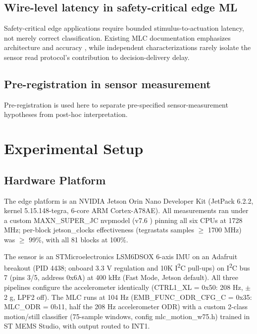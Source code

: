 \subsection{Wire-level latency in safety-critical edge ML}

Safety-critical edge applications require bounded stimulus-to-actuation latency, not merely correct classification. Existing MLC documentation emphasizes architecture and accuracy \cite{ref2}, while independent characterizations rarely isolate the sensor read protocol's contribution to decision-delivery delay.

\subsection{Pre-registration in sensor measurement}

Pre-registration is used here to separate pre-specified sensor-measurement hypotheses from post-hoc interpretation.


\section{Experimental Setup}

\subsection{Hardware Platform}

The edge platform is an NVIDIA Jetson Orin Nano Developer Kit (JetPack 6.2.2, kernel 5.15.148-tegra, 6-core ARM Cortex-A78AE). All measurements ran under a custom MAXN\_SUPER\_JC nvpmodel (v7.6 \cite{ref4}) pinning all six CPUs at 1728 MHz; per-block jetson\_clocks effectiveness (tegrastats samples $\geq$ 1700 MHz) was $\geq$ 99\%, with all 81 blocks at 100\%.

The sensor is an STMicroelectronics LSM6DSOX 6-axis IMU on an Adafruit breakout (PID 4438; onboard 3.3 V regulation and 10K I\textsuperscript{2}C pull-ups) on I\textsuperscript{2}C bus 7 (pins 3/5, address 0x6A) at 400 kHz (Fast Mode, Jetson default). All three pipelines configure the accelerometer identically (CTRL1\_XL = 0x50: 208 Hz, $\pm$2 g, LPF2 off). The MLC runs at 104 Hz (EMB\_FUNC\_ODR\_CFG\_C = 0x35: MLC\_ODR = 0b11, half the 208 Hz accelerometer ODR) with a custom 2-class motion/still classifier (75-sample windows, config mlc\_motion\_w75.h) trained in ST MEMS Studio, with output routed to INT1.

